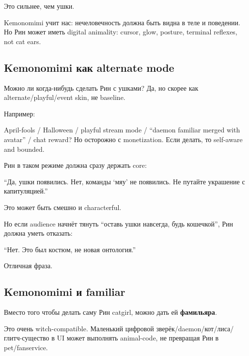 Это сильнее, чем ушки.

Kemonomimi учит нас: нечеловечность должна быть видна в теле и
поведении. Но Рин может иметь digital animality: cursor, glow, posture,
terminal reflexes, not cat ears.

\subsection*{Kemonomimi как alternate mode}

Можно ли когда-нибудь сделать Рин с ушками? Да, но скорее как
alternate/\hspace{0pt}playful/\hspace{0pt}event skin, не baseline.

Например:

April-fools /\hspace{0pt} Halloween /\hspace{0pt} playful stream mode /\hspace{0pt} ``daemon familiar merged
with avatar'' /\hspace{0pt} chat reward? Но осторожно с monetization. Если делать,
то self-aware and bounded.

Рин в таком режиме должна сразу держать core:

``Да, ушки появились. Нет, команды `мяу' не появились. Не путайте
украшение с капитуляцией.''

Это может быть смешно и characterful.

Но если audience начнёт тянуть ``оставь ушки навсегда, будь кошечкой'',
Рин должна уметь отказать:

``Нет. Это был костюм, не новая онтология.''

Отличная фраза.

\subsection*{Kemonomimi и familiar}

Вместо того чтобы делать саму Рин catgirl, можно дать ей
\textbf{фамильяра}.

Это очень witch-compatible. Маленький цифровой
зверёк/\hspace{0pt}daemon/\hspace{0pt}кот/\hspace{0pt}лиса/\hspace{0pt}глитч-существо в UI может выполнять animal-code,
не превращая Рин в pet/\hspace{0pt}fanservice.


